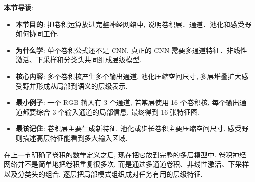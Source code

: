 \documentclass{../nndlcourse}
\begin{document}
\textbf{本节导读}:
\begin{itemize}
    \item \textbf{本节目的}: 把卷积运算放进完整神经网络中, 说明卷积层、通道、池化和感受野如何协同工作.
    \item \textbf{为什么学}: 单个卷积公式还不是 CNN, 真正的 CNN 需要多通道特征、非线性激活、下采样和分类头共同组成层级模型.
    \item \textbf{核心内容}: 多个卷积核产生多个输出通道, 池化压缩空间尺寸, 多层堆叠扩大感受野并形成从局部到语义的层级表示.
    \item \textbf{最小例子}: 一个 RGB 输入有 3 个通道, 若某层使用 16 个卷积核, 每个输出通道都要综合 3 个输入通道的局部信息, 最终得到 16 张特征图.
    \item \textbf{最该记住}: 卷积层主要生成新特征, 池化或步长卷积主要压缩空间尺寸, 感受野则描述高层特征能看到多大输入区域.
\end{itemize}

在上一节明确了卷积的数学定义之后, 现在把它放到完整的多层模型中. 卷积神经网络并不是简单地把卷积重复很多次, 而是通过多通道卷积、非线性激活、下采样以及分类头的组合, 逐层把局部模式组织成对任务有用的层级特征.
\end{document}
